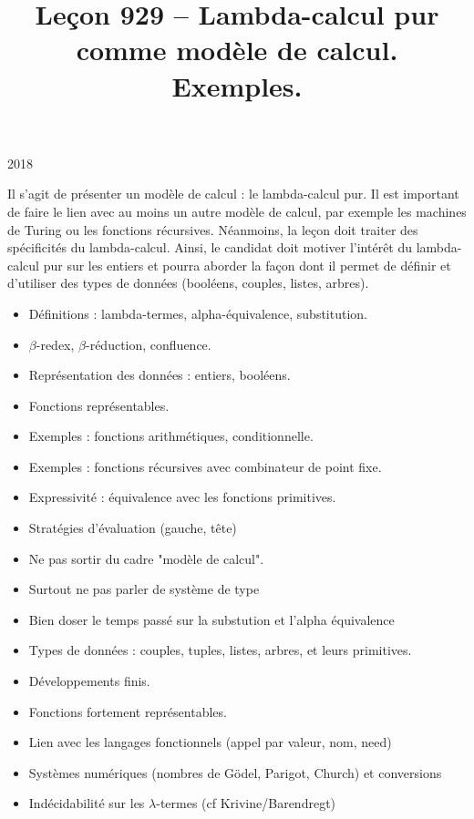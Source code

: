 \documentclass{agregfiche}
\title{Leçon 929 -- Lambda-calcul pur comme modèle de calcul. Exemples.}
\begin{document}
\maketitle

\secrapports

\begin{rapport}{2018}

Il s'agit de présenter un modèle de calcul : le lambda-calcul pur.
Il est important de faire le lien avec au moins un autre modèle de calcul, par exemple les machines de Turing ou les fonctions récursives.
Néanmoins, la leçon doit traiter des spécificités du lambda-calcul.
Ainsi, le candidat doit motiver l'intérêt du lambda-calcul pur sur les entiers et pourra aborder la façon dont il permet de définir et d'utiliser des types de données (booléens, couples, listes, arbres).

\end{rapport}

\secindispensables

\begin{itemize}
    \item Définitions : lambda-termes, alpha-équivalence, substitution.
    \item $\beta$-redex, $\beta$-réduction, confluence.
    \item Représentation des données : entiers, booléens.
    \item Fonctions représentables.
    \item Exemples : fonctions arithmétiques, conditionnelle.
    \item Exemples : fonctions récursives avec combinateur de point fixe.
    \item Expressivité : équivalence avec les fonctions primitives.
    \item Stratégies d'évaluation (gauche, tête)
\end{itemize}

\secpieges

\begin{itemize}
    \item Ne pas sortir du cadre "modèle de calcul".
    \item Surtout ne pas parler de système de type
    \item Bien doser le temps passé sur la substution et l'alpha équivalence
\end{itemize}

\secidees

\begin{itemize}
    \item Types de données : couples, tuples, listes, arbres, et leurs primitives.
    \item Développements finis.
    \item Fonctions fortement représentables.
    \item Lien avec les langages fonctionnels (appel par valeur, nom, need)
    \item Systèmes numériques (nombres de Gödel, Parigot, Church) et conversions
    \item Indécidabilité sur les $\lambda$-termes (cf Krivine/Barendregt)
\end{itemize}
\end{document}
